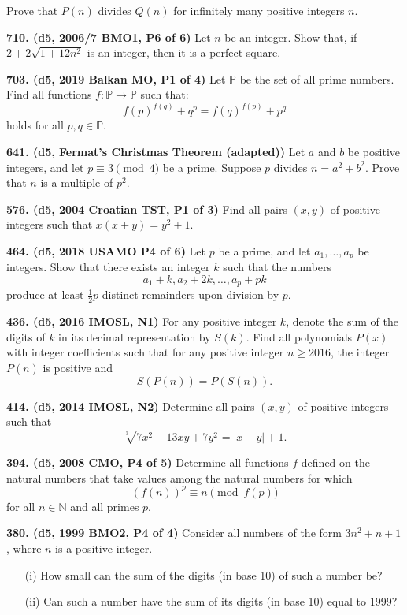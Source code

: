 \documentclass{article}
\begin{document}
Prove that $P(n)$ divides $Q(n)$ for infinitely many positive integers $n$.

\textbf{710. (\color{red}d5\color{black}, 2006/7 BMO1, P6 of 6)} Let $n$ be an integer. Show that, if $2+2\sqrt{1+12n^2}$ is an integer, then it is a perfect square.

\textbf{703. (\color{red}d5\color{black}, 2019 Balkan MO, P1 of 4)} Let $\mathbb{P}$ be the set of all prime numbers. Find all functions $f:\mathbb{P}\rightarrow\mathbb{P}$ such that:
$$f(p)^{f(q)}+q^p=f(q)^{f(p)}+p^q$$holds for all $p,q\in\mathbb{P}$.

\textbf{641. (\color{red}d5\color{black}, Fermat's Christmas Theorem (adapted))} Let $a$ and $b$ be positive integers, and let $p \equiv 3 \pmod{4}$ be a prime. Suppose $p$ divides $n=a^2+b^2$. Prove that $n$ is a multiple of $p^2$.

\textbf{576. (\color{red}d5\color{black}, 2004 Croatian TST, P1 of 3)} Find all pairs $(x,y)$ of positive integers such that $x(x+y) = y^2 + 1$.

\textbf{464. (\color{red}d5\color{black}, 2018 USAMO P4 of 6)} Let $p$ be a prime, and let $a_1, \dots, a_p$ be integers. Show that there exists an integer $k$ such that the numbers $$a_1 + k, a_2 + 2k, \dots, a_p + pk$$ produce at least $\frac{1}{2} p$ distinct remainders upon division by $p.$

\textbf{436. (\color{red}d5\color{black}, 2016 IMOSL, N1)} For any positive integer $k$, denote the sum of the digits of $k$ in its decimal representation by $S(k)$. Find all polynomials $P(x)$ with integer coefficients such that for any positive integer $n \ge 2016$, the integer $P(n)$ is positive and \begin{equation*}S(P(n)) = P(S(n)).\end{equation*}

\textbf{414. (\color{red}d5\color{black}, 2014 IMOSL, N2)} Determine all pairs $(x, y)$ of positive integers such that $$\sqrt[3]{7x^2 - 13xy + 7y^2} = \vert x - y \vert + 1. $$

\textbf{394. (\color{red}d5\color{black}, 2008 CMO, P4 of 5)} Determine all functions $f$ defined on the natural numbers that take values among the natural numbers for which \begin{equation*} \left(f(n)\right)^p \equiv n \pmod{f(p)}\end{equation*} for all $n\in\mathbb{N}$ and all primes $p$.

\textbf{380. (\color{red}d5\color{black}, 1999 BMO2, P4 of 4)} Consider all numbers of the form $3n^2 + n + 1$, where $n$ is a positive integer. \begin{enumerate}\item[(i)]{How small can the sum of the digits (in base 10) of such a number be?}\item[(ii)]{Can such a number have the sum of its digits (in base 10) equal to 1999?}\end{enumerate}
\end{document}

